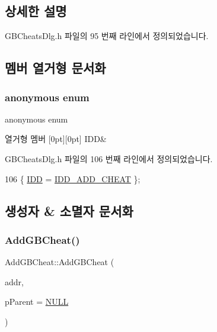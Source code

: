 \subsection{상세한 설명}


G\+B\+Cheats\+Dlg.\+h 파일의 95 번째 라인에서 정의되었습니다.



\subsection{멤버 열거형 문서화}
\mbox{\label{class_add_g_b_cheat_ae307c54936e2ef002f6323ab0d1fa05e}} 
\subsubsection{\texorpdfstring{anonymous enum}{anonymous enum}}
{\footnotesize\ttfamily anonymous enum}

\begin{DoxyEnumFields}{열거형 멤버}
[0pt][0pt]{}\mbox{\label{class_add_g_b_cheat_ae307c54936e2ef002f6323ab0d1fa05eaa142321cb7a25da95b16f0c2ea74993f}} 
I\+DD&\\
\hline

\end{DoxyEnumFields}


G\+B\+Cheats\+Dlg.\+h 파일의 106 번째 라인에서 정의되었습니다.


\begin{DoxyCode}
106 \{ \mbox{\hyperlink{class_add_g_b_cheat_ae307c54936e2ef002f6323ab0d1fa05eaa142321cb7a25da95b16f0c2ea74993f}{IDD}} = \mbox{\hyperlink{resource_8h_ad4208f6eab3496843a3a8f652140f45b}{IDD\_ADD\_CHEAT}} \};
\end{DoxyCode}


\subsection{생성자 \& 소멸자 문서화}
\mbox{\label{class_add_g_b_cheat_a1794ccc1e4826b5a8b179d20557955b8}} 
\subsubsection{\texorpdfstring{Add\+G\+B\+Cheat()}{AddGBCheat()}}
{\footnotesize\ttfamily Add\+G\+B\+Cheat\+::\+Add\+G\+B\+Cheat (\begin{DoxyParamCaption}\item[{\mbox{\hyperlink{_system_8h_a10e94b422ef0c20dcdec20d31a1f5049}{u32}}}]{addr,  }\item[{C\+Wnd $\ast$}]{p\+Parent = {\ttfamily \mbox{\hyperlink{_system_8h_a070d2ce7b6bb7e5c05602aa8c308d0c4}{N\+U\+LL}}} }\end{DoxyParamCaption})}



